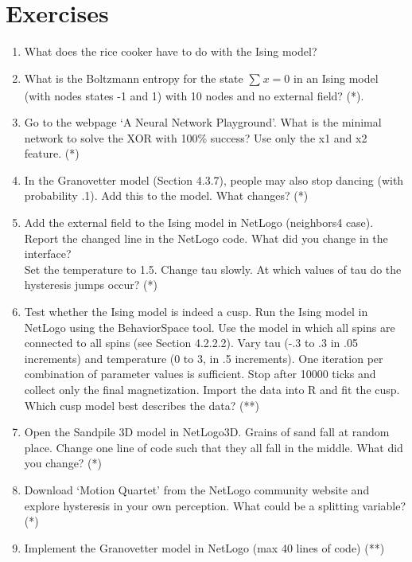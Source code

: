 \documentclass[
  letterpaper,
]{scrbook}
\begin{document}
\hypertarget{exercises-3}{%
\section{Exercises}\label{exercises-3}}

\begin{enumerate}
\def\labelenumi{\arabic{enumi})}
\item
  What does the rice cooker have to do with the Ising model?
\item
  What is the Boltzmann entropy for the state \(\sum_{}^{}x = 0\) in an
  Ising model (with nodes states -1 and 1) with 10 nodes and no external
  field? (*).
\item
  Go to the webpage `A Neural Network Playground'. What is the minimal
  network to solve the XOR with 100\% success? Use only the x1 and x2
  feature. (*)
\item
  In the Granovetter model (Section 4.3.7), people may also stop dancing
  (with probability .1). Add this to the model. What changes? (*)
\item
  Add the external field to the Ising model in NetLogo (neighbors4
  case). Report the changed line in the NetLogo code. What did you
  change in the interface?\\
  Set the temperature to 1.5. Change tau slowly. At which values of tau
  do the hysteresis jumps occur? (*)
\item
  Test whether the Ising model is indeed a cusp. Run the Ising model in
  NetLogo using the BehaviorSpace tool. Use the model in which all spins
  are connected to all spins (see Section 4.2.2.2). Vary tau (-.3 to .3
  in .05 increments) and temperature (0 to 3, in .5 increments). One
  iteration per combination of parameter values is sufficient. Stop
  after 10000 ticks and collect only the final magnetization. Import the
  data into R and fit the cusp. Which cusp model best describes the
  data? (**)
\item
  Open the Sandpile 3D model in NetLogo3D. Grains of sand fall at random
  place. Change one line of code such that they all fall in the middle.
  What did you change? (*)
\item
  Download `Motion Quartet' from the NetLogo community website and
  explore hysteresis in your own perception. What could be a splitting
  variable? (*)
\item
  Implement the Granovetter model in NetLogo (max 40 lines of code) (**)
\end{enumerate}
\end{document}
